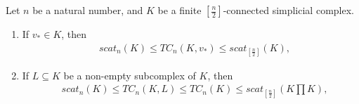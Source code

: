 \documentclass[10pt,a4paper]{amsart}
\begin{document}
\begin{theorem}
Let $n$ be a natural number, and $K$ be a finite $[\frac{n}{2}]$-connected simplicial complex.
\begin{enumerate}
\item
If  $v_* \in K$, then
\begin{align}
& scat_{n } (K) \le TC_{n} (K,v_*) \le scat_{[\frac{n}{2}]} (K), \label{eqnw1}
\end{align}


\item
If $L\subseteq K$ be a non-empty subcomplex of $K$, then 
\begin{align}
& scat_{n}(K)\leq TC_{n}(K,L) \le TC_{n}(K) \leq scat_{[\frac{n}{2}]}(K\prod K), \label{eqnw3}
\end{align}


\end{enumerate}
\end{theorem}
\end{document}
